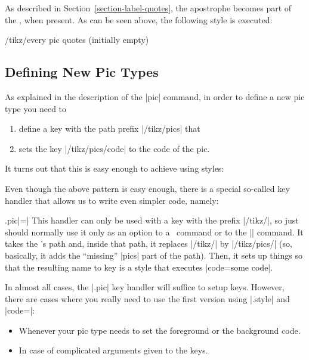 As described in Section~\ref{section-label-quotes}, the apostrophe becomes part
of the , when present. As can be seen above, the following style
is executed:
%
\begin{stylekey}{/tikz/every pic quotes (initially \normalfont empty)}
\end{stylekey}


\subsection{Defining New Pic Types}
\label{section-new-pic-types}

As explained in the description of the |pic| command, in order to define a new
pic type you need to
%
\begin{enumerate}
    \item define a key with the path prefix |/tikz/pics| that
    \item sets the key |/tikz/pics/code| to the code of the pic.
\end{enumerate}

It turns out that this is easy enough to achieve using styles:

\begin{codeexample}
\end{codeexample}

Even though the above pattern is easy enough, there is a special so-called key
handler that allows us to write even simpler code, namely:
%
\begin{codeexample}
\end{codeexample}

\begin{handler}{{.pic}|=|}
    This handler can only be used with a key with the prefix |/tikz/|, so just
    should normally use it only as an option to a \tikzname\ command or to the
    |\tikzset| command. It takes the 's path and, inside that path,
    it replaces |/tikz/| by |/tikz/pics/| (so, basically, it adds the
    ``missing'' |pics| part of the path). Then, it sets up things so that the
    resulting name to key is a style that executes |code=some code|.
\end{handler}

In almost all cases, the |.pic| key handler will suffice to setup keys.
However, there are cases where you really need to use the first version using
|.style| and |code=|:
%
\begin{itemize}
    \item Whenever your pic type needs to set the foreground or the background
        code.
    \item In case of complicated arguments given to the keys.
\end{itemize}

